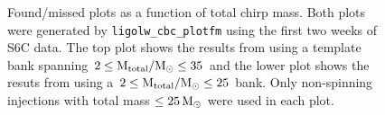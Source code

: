 \begin{figure}[p]
\center
{}
\label{fig:smaller_bank_investigation-lowmass}
\caption{Found/missed plots as a function of total chirp mass. Both plots were generated by \texttt{ligolw\_cbc\_plotfm} using the first two weeks of S6C data. The top plot shows the results from using a template bank spanning $2 \leq \mathrm{M_{total}}/\mathrm{M_\odot} \leq 35$ and the lower plot shows the resuts from using a $2 \leq \mathrm{M_{total}}/\mathrm{M_\odot} \leq 25$ bank. Only non-spinning injections with total mass $\leq 25\,\mathrm{M_\odot}$ were used in each plot.}
\end{figure}


